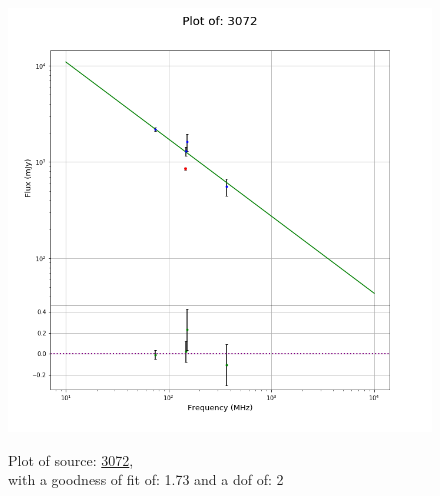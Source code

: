 \documentclass{article}
\begin{document}
\begin{figure}[H]
\begin{minipage}{0.5\textwidth}
        \includegraphics[scale = 0.35]{KmeulenTrap4P23_1hr/1hr3072.png}
        \captionsetup{labelformat=empty}
        \caption{Plot of source: \href{http://banana.transientskp.org/r4/vlo_KmeulenTrap4P23/runningcatalog/3072}{3072},\\with a goodness of fit of: 1.73 and a dof of: 2}
    \addtocounter{figure}{-1}
    \label{KmeulenTrap4P23:1hr:3072:plot}
    \end{minipage}
\end{figure}
\end{document}
